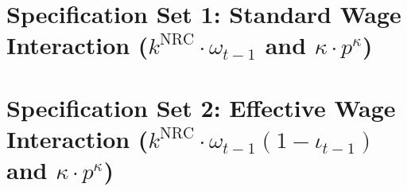\documentclass[11pt,a4paper]{article}
\begin{document}
\FloatBarrier
\section{Specification Set 1: Standard Wage Interaction ($k^{\text{NRC}} \cdot \omega_{t-1}$ and $\kappa \cdot p^{\kappa}$)}
\FloatBarrier


\FloatBarrier
\section{Specification Set 2: Effective Wage Interaction ($k^{\text{NRC}} \cdot \omega_{t-1}(1-\iota_{t-1})$ and $\kappa \cdot p^{\kappa}$)}
\FloatBarrier

\end{document}
